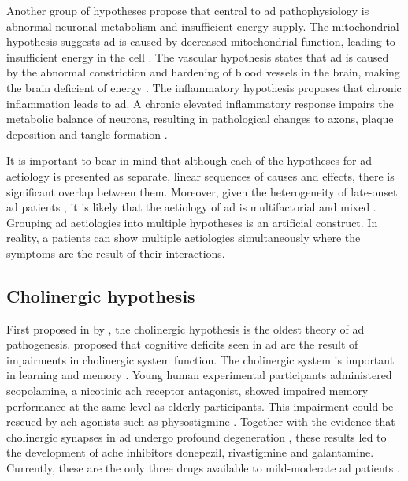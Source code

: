 Another group of hypotheses propose that central to \gls{ad} pathophysiology is abnormal neuronal metabolism and insufficient energy supply. The mitochondrial hypothesis suggests \gls{ad} is caused by decreased mitochondrial function, leading to insufficient energy in the cell \citep{zhu06a, swerdlow14}. The vascular hypothesis states that \gls{ad} is caused by the abnormal constriction and hardening of blood vessels in the brain, making the brain deficient of energy \citep{luchsinger05, mamelak17}. The inflammatory hypothesis proposes that chronic inflammation leads to \gls{ad}. A chronic elevated inflammatory response impairs the metabolic balance of neurons, resulting in pathological changes to axons, plaque deposition and tangle formation \citep{krstic13}. 

It is important to bear in mind that although each of the hypotheses for \gls{ad} aetiology is presented as separate, linear sequences of causes and effects, there is significant overlap between them. Moreover, given the heterogeneity of late-onset \gls{ad} patients \citep{komarova11, tschanz11}, it is likely that the aetiology of \gls{ad} is multifactorial and mixed \citep{schneider07}. Grouping \gls{ad} aetiologies into multiple hypotheses is an artificial construct. In reality, a patients can show multiple aetiologies simultaneously where the symptoms are the result of their interactions. 

\subsection{Cholinergic hypothesis\label{ach-hypo}}

First proposed in \citeyear{bartus82} by \citeauthor{bartus82}, the cholinergic hypothesis is the oldest theory of \gls{ad} pathogenesis. \citet{bartus82} proposed that cognitive deficits seen in \gls{ad} are the result of impairments in cholinergic system function. The cholinergic system is important in learning and memory \citep{deutsch71}. Young human experimental participants administered scopolamine, a nicotinic \gls{ach} receptor antagonist, showed impaired memory performance at the same level as elderly participants. This impairment could be rescued by \gls{ach} agonists such as physostigmine \citep{drachman74}. Together with the evidence that cholinergic synapses in \gls{ad} undergo profound degeneration \citep{whitehouse82}, these results led to the development of \gls{ache} inhibitors donepezil, rivastigmine and galantamine. Currently, these are the only three drugs available to mild-moderate \gls{ad} patients \citep[][ also see Section \ref{treatment}]{bartus00}. 

